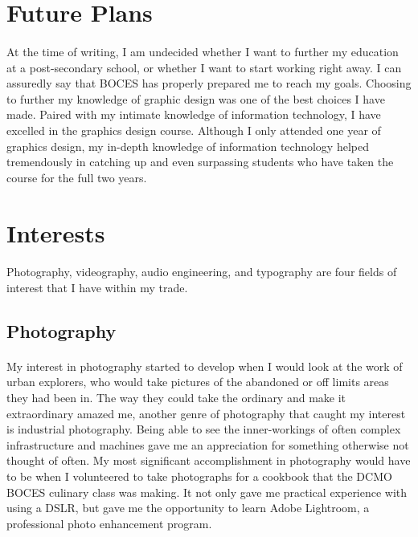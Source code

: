 \section{Future Plans}
\paragraph{}
At the time of writing, I am undecided whether I want to further my education at
a post-secondary school, or whether I want to start working right away. I can
assuredly say that BOCES has properly prepared me to reach my goals. Choosing
to further my knowledge of graphic design was one of the best choices I have
made. Paired with my intimate knowledge of information technology, I have
excelled in the graphics design course. Although I only attended one year of
graphics design, my in-depth knowledge of information technology helped
tremendously in catching up and even surpassing students who have taken the
course for the full two years.
\par

\section{Interests}
\paragraph{}
Photography, videography, audio engineering, and typography are four fields of
interest that I have within my trade. 
\par

\subsection{Photography}
\paragraph{}
My interest in photography started to
develop when I would look at the work of urban explorers, who would take
pictures of the abandoned or off limits areas they had been in. The way they
could take the ordinary and make it extraordinary amazed me, another genre of
photography that caught my interest is industrial photography. Being able to see
the inner-workings of often complex infrastructure and machines gave me an
appreciation for something otherwise not thought of often. My most significant
accomplishment in photography would have to be when I volunteered to take
photographs for a cookbook that the DCMO BOCES culinary class was making. It
not only gave me practical experience with using a DSLR, but gave me the
opportunity to learn Adobe Lightroom, a professional photo enhancement program.
\par

